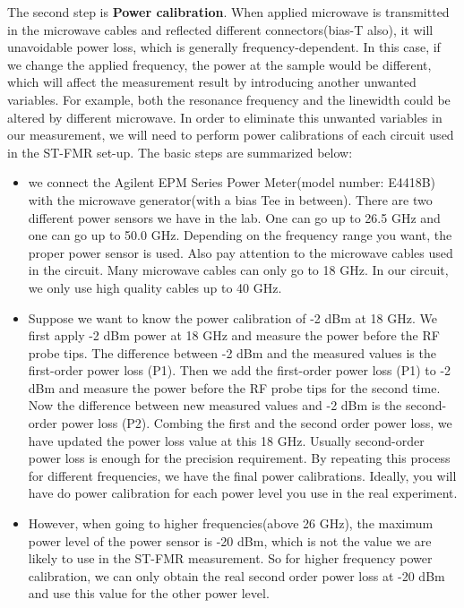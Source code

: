 The second step is \textbf{Power calibration}. When applied microwave is transmitted in the microwave cables and reflected different connectors(bias-T also), it will unavoidable power loss, which is generally frequency-dependent. In this case, if we change the applied frequency, the power at the sample would be different, which will affect the measurement result by introducing another unwanted variables. For example, both the resonance frequency and the linewidth could be altered by different microwave. In order to eliminate this unwanted variables in our measurement, we will need to perform power calibrations of each circuit used in the ST-FMR set-up. The basic steps are summarized below:
\begin{itemize}
	\item we connect the Agilent EPM Series Power Meter(model number: E4418B) with the microwave generator(with a bias Tee in between). There are two different power sensors we have in the lab. One can go up to 26.5 GHz and one can go up to 50.0 GHz. Depending on the frequency range you want, the proper power sensor is used. Also pay attention to the microwave cables used in the circuit. Many microwave cables can only go to 18 GHz. In our circuit, we only use high quality cables up to 40 GHz.
	\item Suppose we want to know the power calibration of -2 dBm at 18 GHz. We first apply -2 dBm power at 18 GHz and measure the power before the RF probe tips. The difference between -2 dBm and the measured values is the first-order power loss (P1).  Then we add the first-order power loss (P1) to -2 dBm and measure the power before the RF probe tips for the second time. Now the difference between new measured values and -2 dBm is the second-order power loss (P2). Combing the first and the second order power loss, we have updated the power loss value at this 18 GHz. Usually second-order power loss is enough for the precision requirement. By repeating this process for different frequencies, we have the final power calibrations. Ideally, you will have do power calibration for each power level you use in the real experiment.
	\item However, when going to higher frequencies(above 26 GHz), the maximum power level of the power sensor is -20 dBm, which is not the value we are likely to use in the ST-FMR measurement.  So for higher frequency power calibration, we can only obtain the real second order power loss at -20 dBm and use this value for the other power level. 
\end{itemize}

